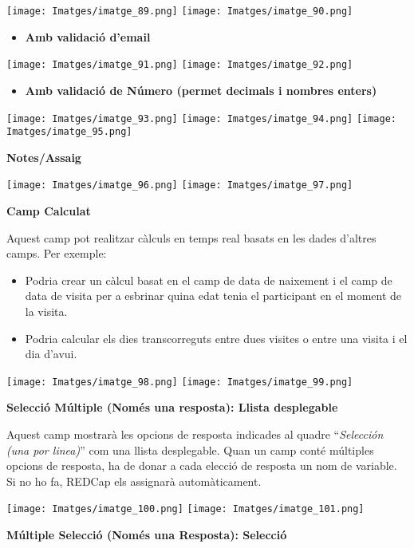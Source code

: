 \documentclass[
]{article}
\providecommand{\tightlist}{%
  \setlength{\itemsep}{0pt}\setlength{\parskip}{0pt}}
\begin{document}
\texttt{[image: Imatges/imatge\_89.png]}
\texttt{[image: Imatges/imatge\_90.png]}

\begin{itemize}
\tightlist
\item
  \textbf{Amb validació d'email}
\end{itemize}

\texttt{[image: Imatges/imatge\_91.png]}
\texttt{[image: Imatges/imatge\_92.png]}

\begin{itemize}
\tightlist
\item
  \textbf{Amb validació de Número (permet decimals i nombres enters)}
\end{itemize}

\texttt{[image: Imatges/imatge\_93.png]}
\texttt{[image: Imatges/imatge\_94.png]}
\texttt{[image: Imatges/imatge\_95.png]}

\textbf{Notes/Assaig}

\texttt{[image: Imatges/imatge\_96.png]}
\texttt{[image: Imatges/imatge\_97.png]}

\textbf{Camp Calculat}

Aquest camp pot realitzar càlculs en temps real basats en les dades d'altres camps. Per exemple:

\begin{itemize}
\tightlist
\item
  Podria crear un càlcul basat en el camp de data de naixement i el camp de data de visita per a esbrinar quina edat tenia el participant en el moment de la visita.
\item
  Podria calcular els dies transcorreguts entre dues visites o entre una visita i el dia d'avui.
\end{itemize}

\texttt{[image: Imatges/imatge\_98.png]}
\texttt{[image: Imatges/imatge\_99.png]}

\textbf{Selecció Múltiple (Només una resposta): Llista desplegable}

Aquest camp mostrarà les opcions de resposta indicades al quadre ``\emph{Selección (una por linea)}'' com una llista desplegable. Quan un camp conté múltiples opcions de resposta, ha de donar a cada elecció de resposta un nom de variable. Si no ho fa, REDCap els assignarà automàticament.

\texttt{[image: Imatges/imatge\_100.png]}
\texttt{[image: Imatges/imatge\_101.png]}

\textbf{Múltiple Selecció (Només una Resposta): Selecció}
\end{document}
